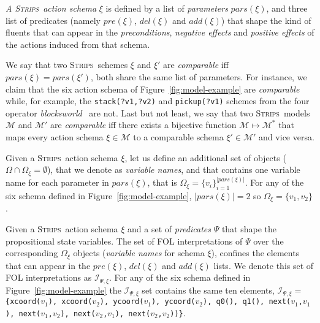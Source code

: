 \documentclass[letterpaper]{article} %
\newcommand{\strips}{\textsc{Strips}}     %
\begin{document}
{\em A \strips\ action schema} $\xi$ is defined by a list of {\em parameters} $pars(\xi)$, and three list of predicates (namely $pre(\xi)$, $del(\xi)$ and $add(\xi)$) that shape the kind of fluents that can appear in the {\em preconditions}, {\em negative effects} and {\em positive effects} of the actions induced from that schema.

We say that two \strips\ schemes $\xi$ and $\xi'$ are {\em comparable} iff $pars(\xi)=pars(\xi')$, both share the same list of parameters. For instance, we claim that the six action schema of Figure~\ref{fig:model-example} are {\em comparable} while, for example, the {\small\tt stack(?v1,?v2)} and {\small\tt pickup(?v1)} schemes from the four operator {\em blocksworld}~\cite{slaney2001blocks} are not. Last but not least, we say that two \strips\ models $\mathcal{M}$ and $\mathcal{M}'$ are {\em comparable} iff there exists a bijective function $\mathcal{M} \mapsto \mathcal{M}^*$ that maps every action schema $\xi\in\mathcal{M}$ to a comparable schema $\xi'\in\mathcal{M'}$ and vice versa.

Given a \strips\ action schema $\xi$, let us define an additional set of objects ($\Omega\cap\Omega_\xi=\emptyset$), that we denote as {\em variable names}, and that contains one variable name for each parameter in $pars(\xi)$, that is $\Omega_\xi=\{v_i\}_{i=1}^{|pars(\xi)|}$. For any of the six schema defined in Figure~\ref{fig:model-example}, $|pars(\xi)|=2$ so $\Omega_\xi=\{v_1,v_2\}$.

Given a \strips\ action schema $\xi$ and a set of {\em predicates} $\Psi$ that shape the propositional state variables. The set of FOL interpretations of $\Psi$ over the corresponding $\Omega_\xi$ objects ({\em variable names} for schema $\xi$), confines the elements that can appear in the $pre(\xi)$, $del(\xi)$ and $add(\xi)$ lists. We denote this set of FOL interpretations as ${\mathcal I}_{\Psi,\xi}$. For any of the six schema defined in Figure~\ref{fig:model-example} the ${\mathcal I}_{\Psi,\xi}$ set contains the same ten elements, ${\mathcal I}_{\Psi,\xi}=${\small\tt\{xcoord($v_1$), xcoord($v_2$), ycoord($v_1$), ycoord($v_2$), q0(), q1(), next($v_1$,$v_1$), next($v_1$,$v_2$), next($v_2$,$v_1$), next($v_2$,$v_2$))\}}.
\end{document}
